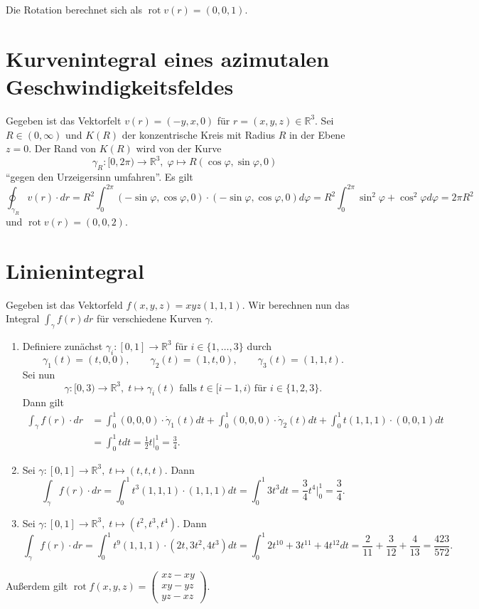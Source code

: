 \documentclass[11pt]{article}
\theoremstyle{plain}
\theoremstyle{definition}
\newcommand{\R}{\mathbb{R}}
\newcommand{\ph}{\varphi}
\newcommand{\longto}{\longrightarrow}
\newcommand{\rot}{\operatorname{rot}}
\begin{document}
Die Rotation berechnet sich als $\rot v(r) = (0,0,1)$.


\section{Kurvenintegral eines azimutalen Geschwindigkeitsfeldes}
Gegeben ist das Vektorfelt $v(r) = (-y, x, 0)$ für $r = (x,y,z) \in \R^3$. Sei $R \in (0, \infty)$ und $K(R)$ der konzentrische Kreis mit Radius $R$ in der Ebene $z = 0$. Der Rand von $K(R)$ wird von der Kurve
\[ \gamma_R : [0, 2\pi) \longto \R^3, \; \ph \longmapsto R (\cos\ph, \sin\ph, 0) \]
``gegen den Urzeigersinn umfahren''. Es gilt
\[ \oint_{\gamma_R} v(r) \cdot dr = R^2 \int_0^{2\pi} (-\sin\ph, \cos\ph, 0) \cdot (-\sin\ph, \cos\ph, 0) d\ph = R^2 \int_0^{2\pi} \sin^2 \ph + \cos^2 \ph d\ph = 2\pi R^2 \]
und $\rot v(r) = (0,0,2)$.


\section{Linienintegral}
Gegeben ist das Vektorfeld $f(x,y,z) = xyz(1,1,1)$. Wir berechnen nun das Integral $\int_\gamma f(r) dr$ für verschiedene Kurven $\gamma$.
\begin{enumerate}[label = \alph*)]
\item Definiere zunächst $\gamma_i : [0,1] \longto \R^3$ für $i \in \{1,\dots, 3\}$ durch
\[ \gamma_1(t) = (t,0,0), \qquad \gamma_2(t) = (1,t,0), \qquad \gamma_3(t) = (1,1,t). \]
Sei nun 
\[ \gamma : [0,3) \longto \R^3, \; t \longmapsto \gamma_i(t) \text{ falls } t \in [i-1, i) \text{ für } i \in \{1,2,3\}. \]
Dann gilt
\begin{align*}
\int_\gamma f(r) \cdot dr &= \int_0^1 (0,0,0) \cdot \dot\gamma_1(t) dt + \int_0^1 (0,0,0) \cdot \dot\gamma_2(t) dt + \int_0^1 t(1,1,1) \cdot (0,0,1) dt \\
&= \int_0^1 t dt = \frac{1}{2} t \Big\vert_0^1 = \frac{3}{4}.
\end{align*}

\item Sei $\gamma : [0,1] \longto \R^3, \; t \longmapsto (t,t,t)$. Dann
\[\int_\gamma f(r) \cdot dr = \int_0^1 t^3(1,1,1)\cdot (1,1,1) dt = \int_0^1 3t^3 dt = \frac{3}{4} t^4 \Big\vert_0^1 = \frac{3}{4}. \]

\item Sei $\gamma : [0,1] \longto \R^3, \; t \longmapsto (t^2, t^3, t^4)$. Dann
\[ \int_\gamma f(r) \cdot dr = \int_0^1 t^9(1,1,1)\cdot (2t, 3t^2, 4t^3) dt = \int_0^1 2t^{10} + 3t^{11} + 4t^{12} dt = \frac{2}{11} + \frac{3}{12} + \frac{4}{13} = \frac{423}{572}. \]
\end{enumerate}

Außerdem gilt $\rot f(x,y,z) = \begin{pmatrix} xz - xy \\ xy - yz \\ yz - xz \end{pmatrix}$.
\end{document}
